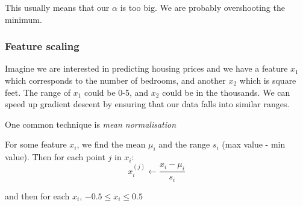 \documentclass[12pt]{article}
\begin{document}
This usually means that our $\alpha$ is too big. We are probably overshooting the minimum. 

\subsubsection{Feature scaling}

Imagine we are interested in predicting housing prices and we have a feature $x_1$ which corresponds to the number of bedrooms, and another $x_2$ which is square feet. The range of $x_1$ could be 0-5, and $x_2$ could be in the thousands. We can speed up gradient descent by ensuring that our data falls into similar ranges. 

One common technique is \textit{mean normalisation} 

For some feature $x_i$, we find the mean $\mu_i$ and the range $s_i$ (max value - min value). Then for each point $j$ in $x_i$:
\[
x_i^{(j)} \leftarrow \frac{x_i - \mu_i}{s_i}
\]

and then for each $x_i$, $-0.5 \leq x_i \leq 0.5$
\end{document}
